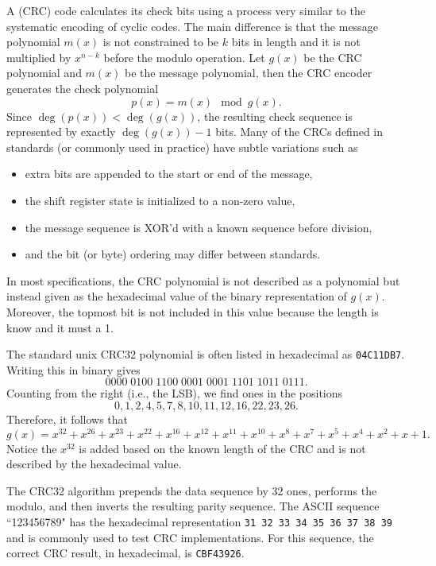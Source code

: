 A  (CRC) code calculates its check bits using a process very similar to the systematic encoding of cyclic codes.
The main difference is that the message polynomial $m(x)$ is not constrained to be $k$ bits in length and it is not multiplied by $x^{n-k}$ before the modulo operation.
Let $g(x)$ be the CRC polynomial and $m(x)$ be the message polynomial, then the CRC encoder generates the check polynomial
\[ p(x) = m(x) \mod g(x). \]
Since  $\deg \left(p(x)\right) < \deg \left(g(x)\right)$, the resulting check sequence is represented by exactly $\deg \left(g(x)\right)-1$ bits.
Many of the CRCs defined in standards (or commonly used in practice) have subtle variations such as
\begin{itemize}
\item extra bits are appended to the start or end of the message,
\item the shift register state is initialized to a non-zero value,
\item the message sequence is XOR'd with a known sequence before division,
\item and the bit (or byte) ordering may differ between standards.
\end{itemize}

In most specifications, the CRC polynomial is not described as a polynomial but instead given as the hexadecimal value of the binary representation of $g(x)$.
Moreover, the topmost bit is not included in this value because the length is know and it must a 1.
\begin{example}
The standard unix CRC32 polynomial is often listed in hexadecimal as \texttt{04C11DB7}.
Writing this in binary gives
\[ 0000\;0100\;1100\;0001\;0001\;1101\;1011\;0111. \]
Counting from the right (i.e., the LSB), we find ones in the positions
\[ 0,1,2,4,5,7,8,10,11,12,16,22,23,26. \]
Therefore, it follows that
\[ g(x) = x^{32} + x^{26} + x^{23} + x^{22} + x^{16} + x^{12} + x^{11} + x^{10} + x^8 + x^7 + x^5 + x^4 + x^2 + x + 1.\]
Notice the $x^{32}$ is added based on the known length of the CRC and is not described by the hexadecimal value.
\end{example}

The CRC32 algorithm prepends the data sequence by 32 ones, performs the modulo, and then inverts the resulting parity sequence.
The ASCII sequence ``123456789" has the hexadecimal representation \texttt{31\,32\,33\,34\,35\,36\,37\,38\,39} and is commonly used to test CRC implementations.
For this sequence, the correct CRC result, in hexadecimal, is \texttt{CBF43926}.


